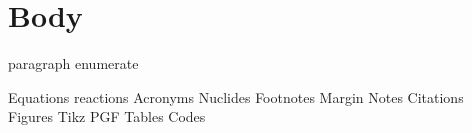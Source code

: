 \chapter{Body}
\label{Chapter:Body}

paragraph enumerate

Equations
reactions
Acronyms
Nuclides
Footnotes
Margin Notes
Citations
Figures
Tikz
PGF
Tables
Codes